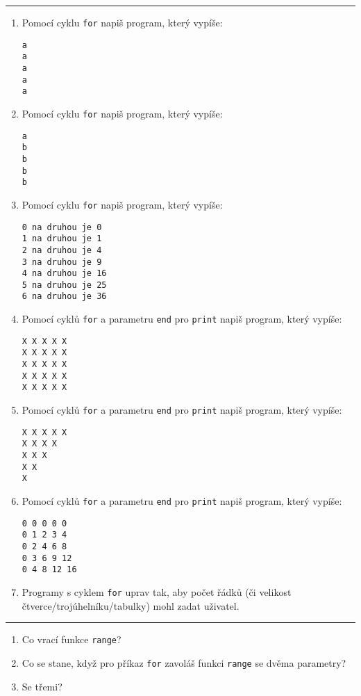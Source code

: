 \documentclass[a4paper,10pt]{article}
\begin{document}
\hrule

\begin{enumerate}[resume]
\item Pomocí cyklu \verb+for+ napiš program, který vypíše:
\begin{verbatim}
a
a
a
a
a
\end{verbatim}

\item Pomocí cyklu \verb+for+ napiš program, který vypíše:
\begin{verbatim}
a
b
b
b
b
\end{verbatim}

\item Pomocí cyklu \verb+for+ napiš program, který vypíše:
\begin{verbatim}
0 na druhou je 0
1 na druhou je 1
2 na druhou je 4
3 na druhou je 9
4 na druhou je 16
5 na druhou je 25
6 na druhou je 36
\end{verbatim}

\item Pomocí cyklů \verb+for+ a parametru \verb+end+ pro \verb+print+ napiš program, který vypíše:
\begin{verbatim}
X X X X X
X X X X X
X X X X X
X X X X X
X X X X X
\end{verbatim}

\item Pomocí cyklů \verb+for+ a parametru \verb+end+ pro \verb+print+ napiš program, který vypíše:
\begin{verbatim}
X X X X X
X X X X
X X X
X X
X
\end{verbatim}

\item Pomocí cyklů \verb+for+ a parametru \verb+end+ pro \verb+print+ napiš program, který vypíše:
\begin{verbatim}
0 0 0 0 0
0 1 2 3 4
0 2 4 6 8
0 3 6 9 12
0 4 8 12 16
\end{verbatim}

\item Programy s cyklem \verb+for+ uprav tak, aby počet řádků
    (či velikost čtverce/trojúhelníku/tabulky)
    mohl zadat uživatel.

\end{enumerate}

\hrule

\begin{enumerate}[resume]
\item Co vrací funkce \verb+range+?

\item Co se stane, když pro příkaz \verb+for+
    zavoláš funkci \verb+range+ se dvěma parametry?

\item Se třemi?

\end{enumerate}
\end{document}
